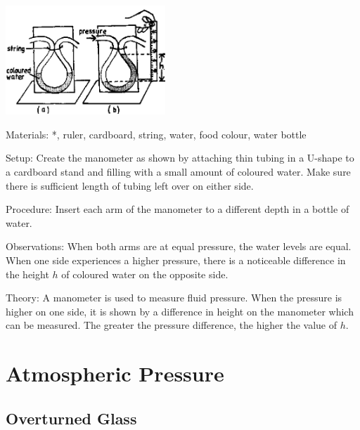 \begin{multicols}{2}
\begin{center}
\includegraphics[width=0.45\textwidth]{./img/source/manometer.png}
\end{center}

\begin{description*}
\item[Materials:]{*, ruler, cardboard, string, water, food colour, water bottle}
\item[Setup:]{Create the manometer as shown by attaching thin tubing in a U-shape to a cardboard stand and filling with a small amount of coloured water. Make sure there is sufficient length of tubing left over on either side.}
\item[Procedure:]{Insert each arm of the manometer to a different depth in a bottle of water.}
\item[Observations:]{When both arms are at equal pressure, the water levels are equal. When one side experiences a higher pressure, there is a noticeable difference in the height $h$ of coloured water on the opposite side.}
\item[Theory:]{A manometer is used to measure fluid pressure. When the pressure is higher on one side, it is shown by a difference in height on the manometer which can be measured. The greater the pressure difference, the higher the value of $h$.}
\end{description*}


\section*{Atmospheric Pressure}


\subsection{Overturned Glass}


\end{multicols}
